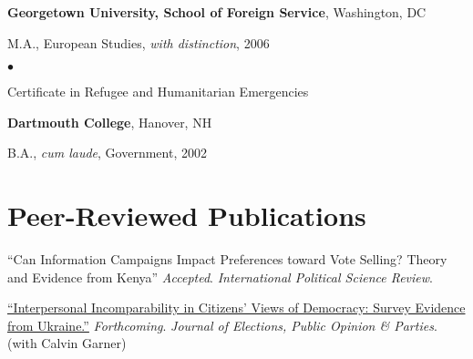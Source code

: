 \documentclass[margin,line]{res}
\newenvironment{list1}{
  \begin{list}{\ding{113}}{%
      \setlength{\itemsep}{0in}
      \setlength{\parsep}{0in} \setlength{\parskip}{0in}
      \setlength{\topsep}{0in} \setlength{\partopsep}{0in} 
      \setlength{\leftmargin}{0.17in}}}{\end{list}}
\newenvironment{list2}{
  \begin{list}{$\bullet$}{%
      \setlength{\itemsep}{0in}
      \setlength{\parsep}{0in} \setlength{\parskip}{0in}
      \setlength{\topsep}{0in} \setlength{\partopsep}{0in} 
      \setlength{\leftmargin}{0.2in}}}{\end{list}}
\begin{document}
{\begin{resume}
{\bf Georgetown University, School of Foreign Service}, Washington, DC \\
\vspace*{-.1in}
\begin{list1}
\item[] M.A., European Studies, \emph{with distinction},  2006
  \begin{list2}
\item[] Certificate in Refugee and Humanitarian Emergencies

\end{list2}
\end{list1}

{\bf Dartmouth College}, Hanover, NH\\
\vspace*{-.1in}
\begin{list1}
\item[] B.A., \emph{cum laude}, Government,  2002
\end{list1}



\section{\sc Peer-Reviewed Publications}
\renewcommand{\labelenumi}{A\theenumi.}
\begin{etaremune}

 \item ``Can Information Campaigns Impact Preferences toward Vote
   Selling? Theory and Evidence from Kenya''
   \emph{Accepted}. \emph{International Political Science Review}.
   
 \item \href{https://doi.org/10.1080/17457289.2018.1554664}{
   ``Interpersonal
     Incomparability in Citizens' Views of Democracy: Survey Evidence
     from Ukraine.''} \emph{Forthcoming}. \emph{Journal of Elections,
     Public Opinion \& Parties}. (with Calvin Garner)


\end{etaremune}
\end{resume}}
\end{document}
